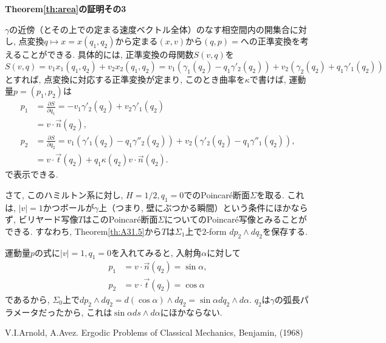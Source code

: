 \documentclass[a4paper]{ujarticle}
\makeatletter
\numberwithin{equation}{section}
\theoremstyle{definition}
\renewenvironment{proof}[1][Proof]{\par
  \pushQED{\qed}%
  \normalfont \topsep6\p@\@plus6\p@\relax
  \trivlist
  \item\relax
  {\bfseries
  #1\@addpunct{.}}\hspace\labelsep\ignorespaces
}{%
  \popQED\endtrivlist\@endpefalse
}
\makeatother
\begin{document}
\begin{proof}[Theorem\ref{th:area}の証明その3]
            $\gamma$の近傍（とその上での定まる速度ベクトル全体）のなす相空間内の開集合に対し,
            点変換$q \mapsto x = x(q_1, q_2)$から定まる$(x, v)$から$(q, p) = $への正準変換を考えることができる.
            具体的には, 正準変換の母関数$S(v, q)$を
            \[
                S(v, q) = v_1 x_1(q_1, q_2) + v_2 x_2(q_1, q_2) = v_1(\gamma_1(q_2) - q_1 \gamma'_2(q_2)) + v_2 (\gamma_2(q_2) + q_1 \gamma'_1(q_2))
            \]
            とすれば, 点変換に対応する正準変換が定まり, このとき曲率を$\kappa$で書けば, 
            運動量$p = (p_1, p_2)$は
            \begin{align}
                p_1 &= \frac{\partial S}{\partial q_1} = - v_1 \gamma'_2(q_2) + v_2 \gamma'_1(q_2) \\
                &= v \cdot \vec{n}(q_2), \\
                p_2 &= \frac{\partial S}{\partial q_2} = v_1 (\gamma'_1(q_2) - q_1 \gamma''_2(q_2)) + v_2 (\gamma'_2(q_2) - q_1 \gamma''_1(q_2)), \\
                &= v \cdot \vec{t}(q_2) + q_1 \kappa(q_2) v \cdot \vec{n}(q_2).
            \end{align}
            で表示できる.

            さて, このハミルトン系に対し, $H = 1/2, q_1 = 0$でのPoincar\'{e}断面$\Sigma$を取る.
            これは, $|v| = 1$かつボールが$\gamma$上（つまり, 壁にぶつかる瞬間）という条件にほかならず,
            ビリヤード写像$T$はこのPoincar\'{e}断面$\Sigma$についてのPoincar\'{e}写像とみることができる.
            すなわち, Theorem\ref{th:A31.5}から$T$は$\Sigma_1$上で$2$-form $d p_2 \wedge d q_2$を保存する.

            運動量$p$の式に$|v| = 1, q_1 = 0$を入れてみると, 入射角$\alpha$に対して
            \begin{align}
                p_1 &= v \cdot \vec{n}(q_2) = \sin{\alpha}, \\
                p_2 &= v \cdot \vec{t}(q_2) = \cos{\alpha}
            \end{align}
            であるから, $\Sigma_0$上で$d p_2 \wedge d q_2 = d (\cos{\alpha}) \wedge d q_2 = \sin{\alpha} d q_2 \wedge d \alpha$.
            $q_2$は$\gamma$の弧長パラメータだったから, これは$\sin{\alpha} d s \wedge d \alpha$にほかならない.
        \end{proof}



        
    

    \begin{thebibliography}{10}
    \nocite{*}
	 V.I.Arnold, A.Avez. Ergodic Problems of Classical Mechanics, Benjamin, (1968)
\end{thebibliography}
\end{document}
